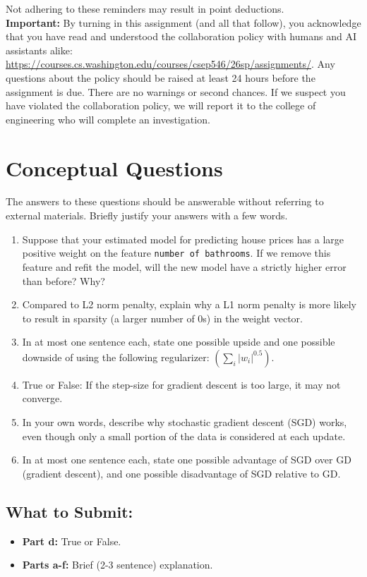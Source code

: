 \documentclass{article}
\begin{document}
Not adhering to these reminders may result in point deductions. \\

\textbf{Important:} By turning in this assignment (and all that follow), you acknowledge that you have read and understood the collaboration policy with humans and AI assistants alike: \url{https://courses.cs.washington.edu/courses/csep546/26sp/assignments/}. Any questions about the policy should be raised at least 24 hours before the assignment is due. There are no warnings or second chances. If we suspect you have violated the collaboration policy, we will report it to the college of engineering who will complete an investigation.

\clearpage{}

\section*{Conceptual Questions}

\begin{aprob}
    The answers to these questions should be answerable without referring to external materials.  Briefly justify your answers with a few words.
    \begin{enumerate}
      \item {} Suppose that your estimated model for predicting house prices has a large positive weight on the feature \texttt{number of bathrooms}. If we remove this feature and refit the model, will the new model have a strictly higher error than before? Why?
      \item {} Compared to L2 norm penalty, explain why a L1 norm penalty is more likely to result in sparsity (a larger number of 0s) in the weight vector.
      \item {} In at most one sentence each, state one possible upside and one possible downside of using the following regularizer: $\left(\sum_{i}\left|w_{i}\right|^{0.5}\right)$.
      \item {} True or False: If the step-size for gradient descent is too large, it may not converge.
      \item {} In your own words, describe why stochastic gradient descent (SGD) works, even though only a small portion of the data is considered at each update.
      \item {} In at most one sentence each, state one possible advantage of SGD over GD (gradient descent), and one possible disadvantage of SGD relative to GD.
    \end{enumerate}

    \subsection*{What to Submit:}
    \begin{itemize}
        \item \textbf{Part d:} True or False.
        \item \textbf{Parts a-f:} Brief (2-3 sentence) explanation.
    \end{itemize}
\end{aprob}
\end{document}
